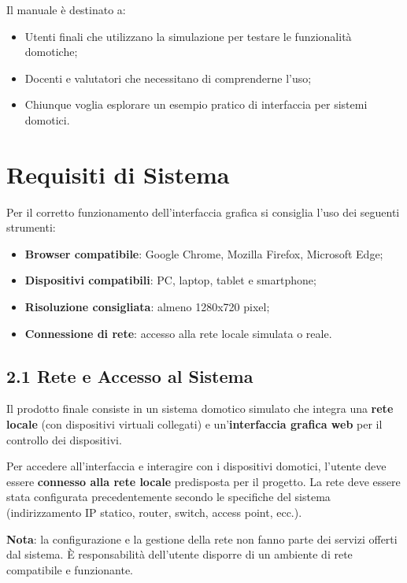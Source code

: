 \documentclass[a4paper,12pt]{article}
\begin{document}
Il manuale è destinato a:
\begin{itemize}
  \item Utenti finali che utilizzano la simulazione per testare le funzionalità domotiche;
  \item Docenti e valutatori che necessitano di comprenderne l’uso;
  \item Chiunque voglia esplorare un esempio pratico di interfaccia per sistemi domotici.
\end{itemize}

\section{Requisiti di Sistema}

Per il corretto funzionamento dell’interfaccia grafica si consiglia l’uso dei seguenti strumenti:

\begin{itemize}[noitemsep]
  \item \textbf{Browser compatibile}: Google Chrome, Mozilla Firefox, Microsoft Edge;
  \item \textbf{Dispositivi compatibili}: PC, laptop, tablet e smartphone;
  \item \textbf{Risoluzione consigliata}: almeno 1280x720 pixel;
  \item \textbf{Connessione di rete}: accesso alla rete locale simulata o reale.
\end{itemize}

\subsection*{2.1 Rete e Accesso al Sistema}

Il prodotto finale consiste in un sistema domotico simulato che integra una \textbf{rete locale} (con dispositivi virtuali collegati) e un’\textbf{interfaccia grafica web} per il controllo dei dispositivi.

Per accedere all’interfaccia e interagire con i dispositivi domotici, l’utente deve essere \textbf{connesso alla rete locale} predisposta per il progetto. La rete deve essere stata configurata precedentemente secondo le specifiche del sistema (indirizzamento IP statico, router, switch, access point, ecc.).

\textbf{Nota}: la configurazione e la gestione della rete non fanno parte dei servizi offerti dal sistema. È responsabilità dell’utente disporre di un ambiente di rete compatibile e funzionante.
\end{document}
